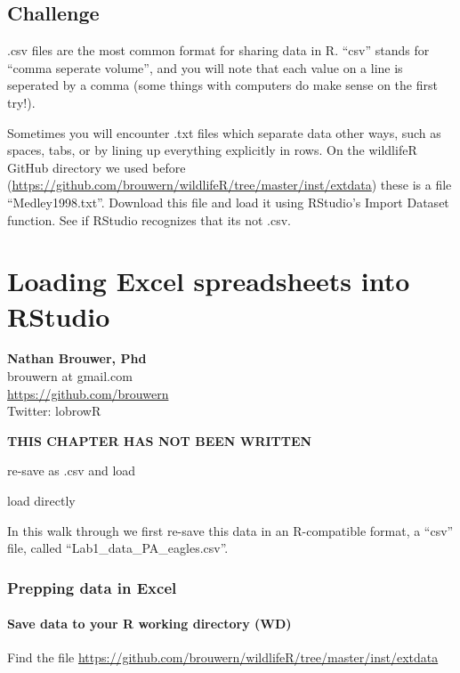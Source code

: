 \documentclass[]{book}
\theoremstyle{definition}
\theoremstyle{definition}
\theoremstyle{definition}
\theoremstyle{remark}
\begin{document}
\section{Challenge}\label{challenge-2}

.csv files are the most common format for sharing data in R. ``csv''
stands for ``comma seperate volume'', and you will note that each value
on a line is seperated by a comma (some things with computers do make
sense on the first try!).

Sometimes you will encounter .txt files which separate data other ways,
such as spaces, tabs, or by lining up everything explicitly in rows. On
the wildlifeR GitHub directory we used before
(\url{https://github.com/brouwern/wildlifeR/tree/master/inst/extdata})
these is a file ``Medley1998.txt''. Download this file and load it using
RStudio's Import Dataset function. See if RStudio recognizes that its
not .csv.

\chapter{Loading Excel spreadsheets into
RStudio}\label{loading-excel-spreadsheets-into-rstudio}

\textbf{Nathan Brouwer, Phd}\\
brouwern at gmail.com\\
\url{https://github.com/brouwern}\\
Twitter: lobrowR

\textbf{THIS CHAPTER HAS NOT BEEN WRITTEN}

re-save as .csv and load

load directly

In this walk through we first re-save this data in an R-compatible
format, a ``csv'' file, called ``Lab1\_data\_PA\_eagles.csv''.

\subsection{Prepping data in Excel}\label{prepping-data-in-excel}

\subsubsection{Save data to your R working directory
(WD)}\label{save-data-to-your-r-working-directory-wd}

Find the file
\url{https://github.com/brouwern/wildlifeR/tree/master/inst/extdata}
\end{document}
